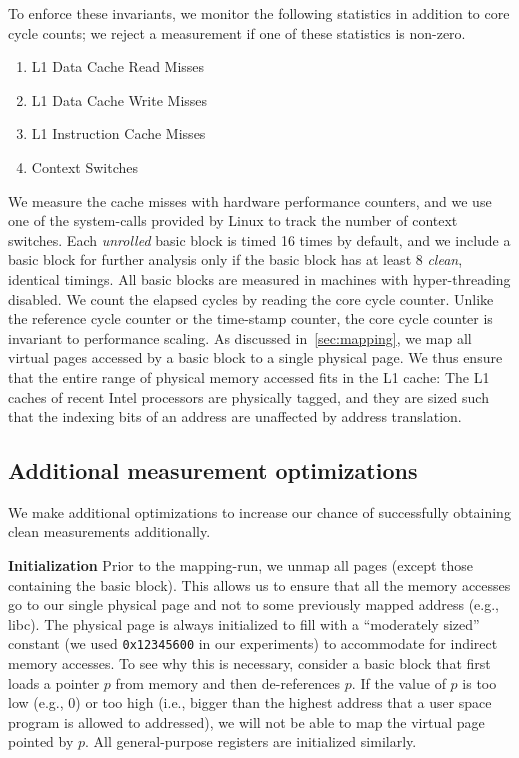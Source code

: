 To enforce these invariants, we monitor the following statistics in addition to core cycle counts;
we reject a measurement if one of these statistics is non-zero. 
\begin{enumerate}
    \item L1 Data Cache Read Misses
    \item L1 Data Cache Write Misses
    \item L1 Instruction Cache Misses
    \item Context Switches
\end{enumerate}
We measure the cache misses with hardware performance counters, 
and we use one of the system-calls provided by Linux to track the number of context switches. 
Each \textit{unrolled} basic block is timed 16 times by default,
and we include a basic block for further analysis only if the basic block has at least 
8 \textit{clean}, identical timings.
All basic blocks are measured in machines with hyper-threading disabled.
We count the elapsed cycles by reading the core cycle counter.
Unlike the reference cycle counter or the time-stamp counter, the core cycle counter is invariant
to performance scaling.
As discussed in~\ref{sec:mapping}, we map all virtual pages accessed by 
a basic block to a single physical page.
We thus ensure that the entire range of physical memory accessed fits in the L1 cache: The L1 caches of recent Intel processors are physically tagged, and
they are sized such that the indexing bits of an address are unaffected by address translation.

\subsection{Additional measurement optimizations}
We make additional optimizations to increase our chance
of successfully obtaining clean measurements additionally.

\textbf{Initialization} 
Prior to the mapping-run,
we unmap all pages (except those containing the basic block).
This allows us to ensure that all the memory accesses go to our single 
physical page and not to some previously mapped address (e.g., libc).
The physical page is
always initialized to fill with a “moderately sized” constant
(we used \verb|0x12345600| in our experiments)
to accommodate for indirect memory accesses.
To see why this is necessary,
consider a basic block that first loads a pointer $p$ from memory
and then de-references $p$.
If the value of $p$ is too low (e.g., 0)
or too high
(i.e., bigger than the highest address that
a user space program is allowed to addressed),
we will not be able to map the virtual page pointed by $p$.
All general-purpose registers are initialized similarly.

